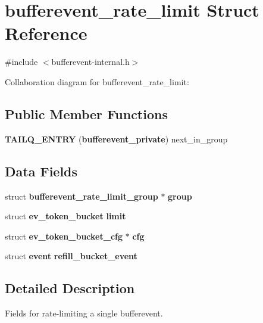 \section{bufferevent\-\_\-rate\-\_\-limit \-Struct \-Reference}
\label{structbufferevent__rate__limit}


{\ttfamily \#include $<$bufferevent-\/internal.\-h$>$}



\-Collaboration diagram for bufferevent\-\_\-rate\-\_\-limit\-:
\subsection*{\-Public \-Member \-Functions}
\begin{DoxyCompactItemize}
\item 
{\bfseries \-T\-A\-I\-L\-Q\-\_\-\-E\-N\-T\-R\-Y} ({\bf bufferevent\-\_\-private}) next\-\_\-in\-\_\-group\label{structbufferevent__rate__limit_af0c127ae79308e67ae215c0eaccd360a}

\end{DoxyCompactItemize}
\subsection*{\-Data \-Fields}
\begin{DoxyCompactItemize}
\item 
struct \*
{\bf bufferevent\-\_\-rate\-\_\-limit\-\_\-group} $\ast$ {\bf group}
\item 
struct {\bf ev\-\_\-token\-\_\-bucket} {\bfseries limit}\label{structbufferevent__rate__limit_a3c810003e1c46e5b95fc1120f23bf782}

\item 
struct {\bf ev\-\_\-token\-\_\-bucket\-\_\-cfg} $\ast$ {\bfseries cfg}\label{structbufferevent__rate__limit_af7192cdbb108fb67a3d1512c87c6c48b}

\item 
struct {\bf event} {\bfseries refill\-\_\-bucket\-\_\-event}\label{structbufferevent__rate__limit_a1792a48af582a7009407e31ad3d268a2}

\end{DoxyCompactItemize}


\subsection{\-Detailed \-Description}
\-Fields for rate-\/limiting a single bufferevent. 

